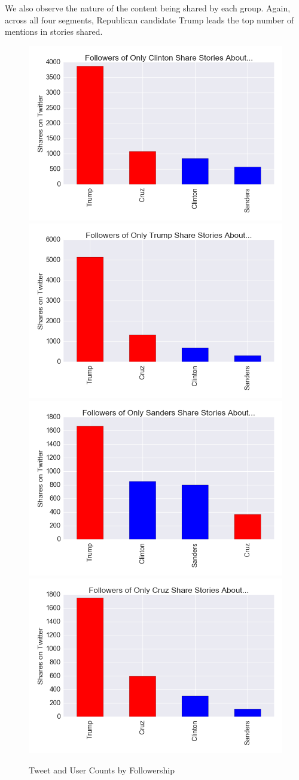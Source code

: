 \documentclass[letterpaper]{article}
\begin{document}
We also observe the nature of the content being shared by each group. Again, across all four segments, Republican candidate Trump leads the top number of mentions in stories shared.

\begin{figure}[t!] 
\centering 
 \includegraphics[width=0.49\columnwidth]{clinton-camp-shares}
 \includegraphics[width=0.49\columnwidth]{trump-camp-shares}  
 \includegraphics[width=0.49\columnwidth]{sanders-camp-shares}  
 \includegraphics[width=0.49\columnwidth]{cruz-camp-shares}  
  \caption{Tweet and User Counts by Followership
    \label{fig:users-tweets-by-candid}}
\end{figure}
 
\end{document}
